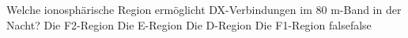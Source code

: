     {Welche ionosphärische Region ermöglicht DX-Verbindungen im 80 m-Band in der Nacht?}
    {Die F2-Region}
    {Die E-Region}
    {Die D-Region}
    {Die F1-Region}
    {false}{false}